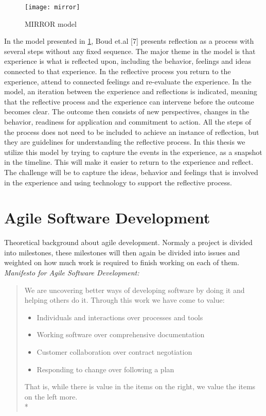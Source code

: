 \begin{figure}[!htpb]
\label{logo}
\centering
	\texttt{[image: mirror]}
\caption{MIRROR model}
\end{figure}

In the model presented in \ref{logo}, Boud et.al [7] presents reflection as a
process with several steps without any fixed sequence. The major theme in
the model is that experience is what is reflected upon, including the behavior,
feelings and ideas connected to that experience. In the reflective process
you return to the experience, attend to connected feelings and re-evaluate
the experience. In the model, an iteration between the experience and reflections
is indicated, meaning that the reflective process and the experience
can intervene before the outcome becomes clear. The outcome then consists
of new perspectives, changes in the behavior, readiness for application
and commitment to action. All the steps of the process does not need to
be included to achieve an instance of reflection, but they are guidelines for
understanding the reflective process.
In this thesis we utilize this model by trying to capture the events in the
experience, as a snapshot in the timeline. This will make it easier to return
to the experience and reflect. The challenge will be to capture the ideas,
behavior and feelings that is involved in the experience and using technology
to support the reflective process.


\section{Agile Software Development}
Theoretical background about agile development. Normaly a project is divided into milestones, these milestones will then again be divided into issues and weighted on how much work is required to finish working on each of them.\linebreak
\emph{Manifesto for Agile Software Development:}\cite{agilemanifesto}
\begin{quotation}
We are uncovering better ways of developing software by doing it and helping others do it. Through this work we have come to value:
\begin{itemize}
\item Individuals and interactions over processes and tools
\item Working software over comprehensive documentation
\item Customer collaboration over contract negotiation
\item Responding to change over following a plan
\end{itemize}
That is, while there is value in the items on
the right, we value the items on the left more.\\*
\end{quotation}

